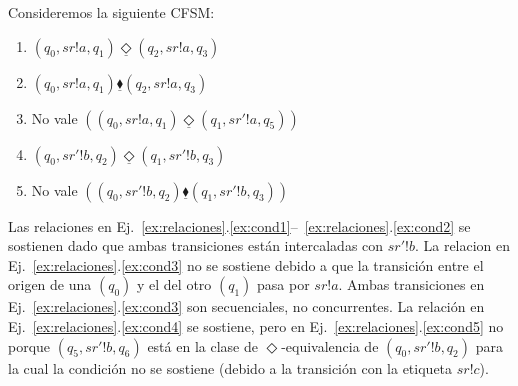 \begin{ejemplo}
\label{ex:relaciones}
Consideremos la siguiente CFSM:
\begin{center}
\end{center}

\begin{enumerate}
    \item \label{ex:cond1} $(q_0, sr!a,q_1) \underline{\Diamond} (q_2,sr!a,q_3)  $ %
    \item \label{ex:cond2} $(q_0, sr!a,q_1) \underline{\blacklozenge} (q_2,sr!a,q_3) $ %
    \item \label{ex:cond3} No vale $ ((q_0, sr!a,q_1) \underline{\Diamond} (q_1,sr'!a,q_5))$ %
    \item \label{ex:cond4} $ (q_0, sr'!b,q_2) \underline{\Diamond} (q_1, sr'!b,q_3)$ %
    \item \label{ex:cond5} No vale $((q_0, sr'!b,q_2) \underline{\blacklozenge} (q_1,sr'!b,q_3)) $
\end{enumerate}

Las relaciones en Ej.~\ref{ex:relaciones}.\ref{ex:cond1}--~\ref{ex:relaciones}.\ref{ex:cond2} se sostienen dado que ambas transiciones están intercaladas con $sr'!b$. La relacion en Ej.~\ref{ex:relaciones}.\ref{ex:cond3} no se sostiene debido a que la transición entre el origen de una $(q_0)$ y el del otro $(q_1)$ pasa por $sr!a$. Ambas transiciones en Ej.~\ref{ex:relaciones}.\ref{ex:cond3} son secuenciales, no concurrentes. La relación en Ej.~\ref{ex:relaciones}.\ref{ex:cond4} se sostiene, pero en Ej.~\ref{ex:relaciones}.\ref{ex:cond5} no porque $(q_5,sr'!b,q_6)$ está en la clase de $\Diamond$-equivalencia de $(q_0,sr'!b,q_2)$ para la cual la condición no se sostiene (debido a la transición con la etiqueta $sr!c$).
\end{ejemplo}

